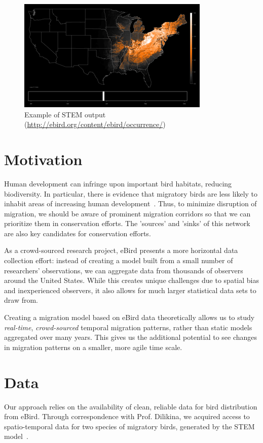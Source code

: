 \documentclass{article} %
\begin{document}
\begin{figure}[h!]
\centering
\includegraphics[scale=0.65] {stem}
\caption[Caption for]{Example of STEM output (\url{http://ebird.org/content/ebird/occurrence/})}
\label{fig:00}
\end{figure}

\section{Motivation}
Human development can infringe upon important bird habitats, reducing biodiversity. In particular, there is evidence that migratory birds are less likely to inhabit areas of increasing human development~\cite{riparian}. Thus, to minimize disruption of migration, we should be aware of prominent migration corridors so that we can prioritize them in conservation efforts. The 'sources' and 'sinks' of this network are also key candidates for conservation efforts.

As a crowd-sourced research project, eBird presents a more horizontal data collection effort: instead of creating a model built from a small number of researchers' observations, we can aggregate data from thousands of observers around the United States. While this creates unique challenges due to spatial bias and inexperienced observers, it also allows for much larger statistical data sets to draw from. 

Creating a migration model based on eBird data theoretically allows us to study \textit{real-time}, \textit{crowd-sourced} temporal migration patterns, rather than static models aggregated over many years. This gives us the additional potential to see changes in migration patterns on a smaller, more agile time scale.

\section{Data}
Our approach relies on the availability of clean, reliable data for bird distribution from eBird. Through correspondence with Prof. Dilikina, we acquired access to spatio-temporal data for two species of migratory birds, generated by the STEM model~\cite{stem}. 
\end{document}
